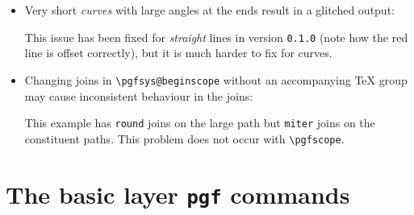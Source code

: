 \documentclass[12pt,a4paper]{article}
\makeatletter
\theoremstyle{definition}
\def\disablewarnings{\def\pgfutil@packagewarning##1##2{}}
\makeatother
\begin{document}
\begin{itemize}
  \item Very short \emph{curves} with large angles at the ends result in a glitched output:\nopagebreak
\begin{tkzexample}[latex=3.75cm,pre=\disablewarnings]
\end{tkzexample}
  This issue has been fixed for \emph{straight} lines in version \texttt{0.1.0} (note how the red line is offset correctly), but it is much harder to fix for curves.
  \item Changing joins in \verb|\pgfsys@beginscope| without an accompanying \TeX{} group may cause inconsistent behaviour in the joins:
\begin{tkzexample}[latex=2cm]
\makeatletter
{}
\makeatother
\end{tkzexample}
  This example has \texttt{round} joins on the large path but \texttt{miter} joins on the constituent paths. This problem does not occur with \verb|\pgfscope|.
\end{itemize}


\section{The basic layer \texttt{pgf} commands}
\end{document}
